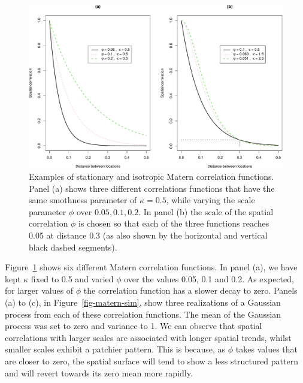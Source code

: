 \documentclass[
  letterpaper,
]{krantz}
\begin{document}
\begin{figure}

{\centering \includegraphics[width=8.5in,height=\textheight]{01_intro_files/figure-pdf/fig-matern-func-1.pdf}

}

\caption{\label{fig-matern-func}Examples of stationary and isotropic
Matern correlation functions. Panel (a) shows three different
correlations functions that have the same smothness parameter of
\(\kappa=0.5\), while varying the scale parameter \(\phi\) over
\({0.05, 0.1, 0.2}\). In panel (b) the scale of the spatial correlation
\(\phi\) is chosen so that each of the three functions reaches 0.05 at
distance 0.3 (as also shown by the horizontal and vertical black dashed
segments).}

\end{figure}

Figure~\ref{fig-matern-func} shows six different Matern correlation
functions. In panel (a), we have kept \(\kappa\) fixed to 0.5 and varied
\(\phi\) over the values 0.05, 0.1 and 0.2. As expected, for larger
values of \(\phi\) the correlation function has a slower decay to zero.
Panels (a) to (c), in Figure~\ref{fig-matern-sim}, show three
realizations of a Gaussian process from each of these correlation
functions. The mean of the Gaussian process was set to zero and variance
to 1. We can observe that spatial correlations with larger scales are
associated with longer spatial trends, whilst smaller scales exhibit a
patchier pattern. This is because, as \(\phi\) takes values that are
closer to zero, the spatial surface will tend to show a less structured
pattern and will revert towards its zero mean more rapidly.
\end{document}
